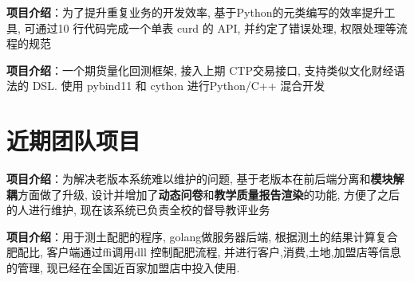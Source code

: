 \documentclass{resume}
\begin{document}
\begin{onehalfspacing}
\textbf{项目介绍}：\quad 为了提升重复业务的开发效率, 基于Python的元类编写的效率提升工具, 可通过10 行代码完成一个单表 curd 的 API, 并约定了错误处理, 权限处理等流程的规范
\end{onehalfspacing}

\begin{onehalfspacing}
\textbf{项目介绍}：\quad 一个期货量化回测框架, 接入上期 CTP交易接口, 支持类似文化财经语法的 DSL. 使用 pybind11 和 cython 进行Python/C++ 混合开发
\end{onehalfspacing} 

\section{\faObjectGroup 近期团队项目}
\begin{onehalfspacing}
  \textbf{项目介绍}：\quad 为解决老版本系统难以维护的问题, 基于老版本在前后端分离和\textbf{模块解耦}方面做了升级, 设计并增加了\textbf{动态问卷}和\textbf{教学质量报告渲染}的功能, 方便了之后的人进行维护, 现在该系统已负责全校的督导教评业务
\end{onehalfspacing}

\begin{onehalfspacing}
  \textbf{项目介绍}：\quad 用于测土配肥的程序, golang做服务器后端, 根据测土的结果计算复合肥配比, 客户端通过ffi调用dll 控制配肥流程,  并进行客户,消费,土地,加盟店等信息的管理, 现已经在全国近百家加盟店中投入使用.
\end{onehalfspacing}
\end{document}
